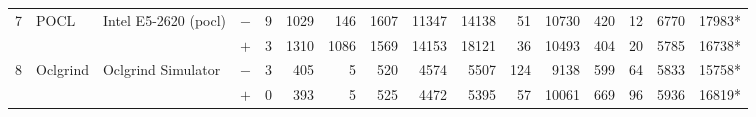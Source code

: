 \begin{tabular}{llll | rrrrrr | rrrrrr }
\hline
\multirow{ 2}{*}{7} & \multirow{ 2}{*}{POCL} & \multirow{ 2}{*}{Intel E5-2620 (pocl)} & $-$ & 9 & 1029 & 146 & 1607 & 11347 & 14138       & 51 & 10730 & 420 & 12 & 6770 & 17983* \\& & & $+$ & 3 & 1310 & 1086 & 1569 & 14153 & 18121 & 36 & 10493 & 404 & 20 & 5785 & 16738* \\
\hline
\multirow{ 2}{*}{8} & \multirow{ 2}{*}{Oclgrind} & \multirow{ 2}{*}{Oclgrind Simulator} & $-$ & 3 & 405 & 5 & 520 & 4574 & 5507       & 124 & 9138 & 599 & 64 & 5833 & 15758* \\& & & $+$ & 0 & 393 & 5 & 525 & 4472 & 5395 & 57 & 10061 & 669 & 96 & 5936 & 16819* \\
  \bottomrule
\end{tabular}

